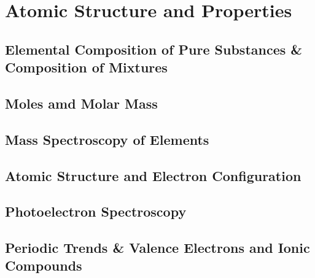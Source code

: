 \documentclass[../chem.tex]{subfiles}
\begin{document}
\chapter{Atomic Structure and Properties}
\section{Elemental Composition of Pure Substances \& Composition of Mixtures}
\section{Moles amd Molar Mass}
\section{Mass Spectroscopy of Elements}
\section{Atomic Structure and Electron Configuration}
\section{Photoelectron Spectroscopy}
\section{Periodic Trends \& Valence Electrons and Ionic Compounds}
\end{document}
